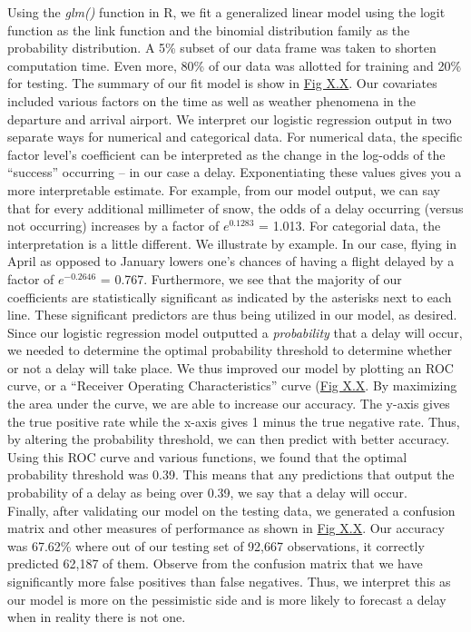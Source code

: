 \documentclass[12pt, a4paper]{book}
\newcommand\tab[1][1cm]{\hspace*{#1}}
\begin{document}
	\tab Using the \textit{glm()} function in R, we fit a generalized linear model using the logit function as the link function and the binomial distribution family as the probability distribution. A 5\% subset of our data frame was taken to shorten computation time. Even more, 80\% of our data was allotted for training and 20\% for testing. The summary of our fit model is show in \underline{Fig X.X}. Our covariates included various factors on the time as well as weather phenomena in the departure and arrival airport. We interpret our logistic regression output in two separate ways for numerical and categorical data. For numerical data, the specific factor level’s coefficient can be interpreted as the change in the log-odds of the “success” occurring – in our case a delay. Exponentiating these values gives you a more interpretable estimate. For example, from our model output, we can say that for every additional millimeter of snow, the odds of a delay occurring (versus not occurring) increases by a factor of $e^{0.1283}$ = 1.013. For categorial data, the interpretation is a little different. We illustrate by example. In our case, flying in April as opposed to January lowers one’s chances of having a flight delayed by a factor of $e^{-0.2646}$ = 0.767. Furthermore, we see that the majority of our coefficients are statistically significant as indicated by the asterisks next to each line. These significant predictors are thus being utilized in our model, as desired. \\
	\tab Since our logistic regression model outputted a \textit{probability} that a delay will occur, we needed to determine the optimal probability threshold to determine whether or not a delay will take place. We thus improved our model by plotting an ROC curve, or a “Receiver Operating Characteristics” curve (\underline{Fig X.X}. By maximizing the area under the curve, we are able to increase our accuracy. The y-axis gives the true positive rate while the x-axis gives 1 minus the true negative rate. Thus, by altering the probability threshold, we can then predict with better accuracy. Using this ROC curve and various functions, we found that the optimal probability threshold was 0.39. This means that any predictions that output the probability of a delay as being over 0.39, we say that a delay will occur. \\
	\tab Finally, after validating our model on the testing data, we generated a confusion matrix and other measures of performance as shown in \underline{Fig X.X}. Our accuracy was 67.62\% where out of our testing set of 92,667 observations, it correctly predicted 62,187 of them. Observe from the confusion matrix that we have significantly more false positives than false negatives. Thus, we interpret this as our model is more on the pessimistic side and is more likely to forecast a delay when in reality there is not one. \\
\end{document}
